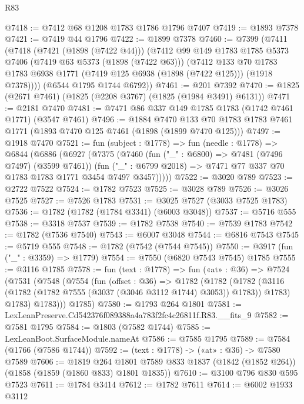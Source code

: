 \begin{lexlean}{R83}
\begin{coremodule}
@7418 := @7412 @68 @1208 @1783 @1786 @1796 @7407
@7419 := @1893 @7378
@7421 := @7419 @44 @1796
@7422 := @1899 @7378
@7460 := @7399
    (@7411
      (@7418
        (@7421 (@1898 (@7422 @44)))
        (@7412
          @99
          @149
          @1783
          @1785
          @5373
          @7406
          (@7419 @63 @5373 (@1898 (@7422 @63)))
          (@7412
            @133
            @70
            @1783
            @1783
            @6938
            @1771
            (@7419 @125 @6938 (@1898 (@7422 @125)))
            (@1918 @7378))))
      (@6544 @1795 @1744 @6792))
@7461 := @201 @7392
@7470 := @1825 (@2671 @7461) (@1825 (@2208 @3767) (@1825 (@1984 @3491) @6131))
@7471 := @2181 @7470
@7481 := @7471 @86 @337 @149 @1785 @1783 (@1742 @7461 @1771) (@3547 @7461)
@7496 := @1884
    @7470
    @133
    @70
    @1783
    @1783
    @7461
    @1771
    (@1893 @7470 @125 @7461 (@1898 (@1899 @7470 @125)))
@7497 := @1918 @7470
@7521 := fun (subject : @1778) =>
  fun (needle : @1778) =>
  @6844
    (@6886
      (@6927
        (@7375
          (@7460
            (fun ("_" : @6800) => @7481 (@7496 @7497) (@3599 @7461))
            (fun ("_" : @6799 @2018) => @7471 @77 @337 @70 @1783 @1783 @1771 @3454 @7497 @3457)))))
@7522 := @3020 @789
@7523 := @2722 @7522
@7524 := @1782 @7523
@7525 := @3028 @789
@7526 := @3026 @7525
@7527 := @7526 @1783
@7531 := @3025 @7527 (@3033 @7525 @1783)
@7536 := @1782 (@1782 (@1784 @3341) (@6003 @3048))
@7537 := @5716 @555
@7538 := @3318 @7537
@7539 := @1782 @7538
@7540 := @7539 @1783
@7542 := @1782 (@7536 @7540)
@7543 := @6007 @3048
@7544 := @6816 @7543
@7545 := @5719 @555
@7548 := @1782 (@7542 (@7544 @7545))
@7550 := @3917 (fun ("_" : @3359) => @1779)
@7554 := @7550 (@6820 @7543 @7545) @1785
@7555 := @3116 @1785
@7578 := fun (text : @1778) =>
  fun («at» : @36) =>
  @7524
    (@7531
      (@7548
        (@7554
          (fun (offset : @36) =>
          @1782
            (@1782
              (@1782 (@3116 (@1782 (@1782 @7555 (@3037 (@3046 @3112 @1744) @3053)) @1783)) @1783)
              @1783)
            @1783)))
      @1785)
@7580 := @1793 @264 @1801
@7581 := LexLeanPreserve.Cd542376f089388a4a783f2fc4c26811f.R83.__fits_9
@7582 := @7581 @1795
@7584 := @1803 (@7582 @1744)
@7585 := LexLeanBoot.SurfaceModule.nameAt
@7586 := @7585 @1795
@7589 := @7584 (@1766 (@7586 @1744))
@7592 := (text : @1778) -> («at» : @36) -> @7580 @7589
@7606 := @1819
    @264
    @1801
    @7589
    @833
    @1837
    (@1842 (@1852 @264))
    (@1858 (@1859 (@1860 @833) @1801 @1835))
@7610 := @3100 @796 @830 @595 @7523
@7611 := @1784 @3414
@7612 := @1782 @7611
@7614 := @6002 @1933 @3112

\end{coremodule}
\end{lexlean}
